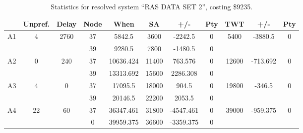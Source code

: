 \begin{sidewaystable}
\footnotesize
\caption{Statistics for resolved system ``RAS DATA SET 2'', costing \$9235.}
\centering
\begin{tabular}{c||c|c||c|c|c|c|c||c|c|c}
  \hline \hline
  &
  Unpref. & 
  Delay &
  Node &
  When &
  SA &
  +/- &
  Pty &
  TWT &
  +/- &
  Pty \\
      \hline
      \multirow{2}{*}{A1} &
      \multirow{2}{*}{4} &
      \multirow{2}{*}{2760} &
      37 &
      5842.5 &
      3600 &
        -2242.5 &
        0 &
      \multirow{2}{*}{5400} &
        \multirow{2}{*}{-3880.5} &
        \multirow{2}{*}{0}
      \\
      \cline{4-8}
       &
       &
       &
      39 &
      9280.5 &
      7800 &
        -1480.5 &
        0 &
      
         &
        
      \\
      \hline
      \multirow{2}{*}{A2} &
      \multirow{2}{*}{0} &
      \multirow{2}{*}{240} &
      37 &
      10636.424 &
      11400 &
        763.576 &
        0 &
      \multirow{2}{*}{12600} &
        \multirow{2}{*}{-713.692} &
        \multirow{2}{*}{0}
      \\
      \cline{4-8}
       &
       &
       &
      39 &
      13313.692 &
      15600 &
        2286.308 &
        0 &
      
         &
        
      \\
      \hline
      \multirow{2}{*}{A3} &
      \multirow{2}{*}{4} &
      \multirow{2}{*}{0} &
      37 &
      17095.5 &
      18000 &
        904.5 &
        0 &
      \multirow{2}{*}{19800} &
        \multirow{2}{*}{-346.5} &
        \multirow{2}{*}{0}
      \\
      \cline{4-8}
       &
       &
       &
      39 &
      20146.5 &
      22200 &
        2053.5 &
        0 &
      
         &
        
      \\
      \hline
      \multirow{2}{*}{A4} &
      \multirow{2}{*}{22} &
      \multirow{2}{*}{60} &
      37 &
      36347.461 &
      31800 &
        -4547.461 &
        0 &
      \multirow{2}{*}{39000} &
        \multirow{2}{*}{-959.375} &
        \multirow{2}{*}{0}
      \\
      \cline{4-8}
       &
       &
       &
      0 &
      39959.375 &
      36600 &
        -3359.375 &
        0 &
      

\end{tabular}
\end{sidewaystable}
